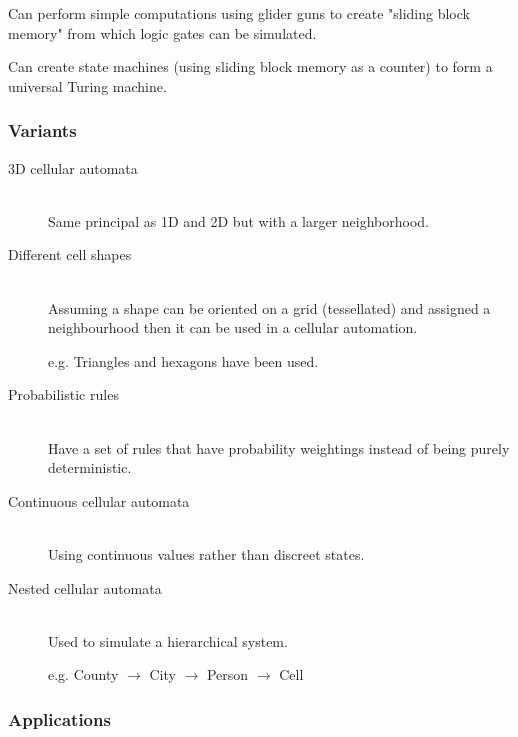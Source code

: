 \documentclass[a4paper]{article}
\begin{document}

Can perform simple computations using glider guns to create "sliding block
memory" from which logic gates can be simulated.

Can create state machines (using sliding block memory as a counter) to form a
universal Turing machine.

\subsubsection{Variants}

\begin{description}
  \item[3D cellular automata] \hfill \\
    Same principal as 1D and 2D but with a larger neighborhood.

  \item[Different cell shapes] \hfill \\
    Assuming a shape can be oriented on a grid (tessellated) and assigned a
    neighbourhood then it can be used in a cellular automation.

    e.g. Triangles and hexagons have been used.

  \item[Probabilistic rules] \hfill \\
    Have a set of rules that have probability weightings instead of being purely
    deterministic.

  \item[Continuous cellular automata] \hfill \\
    Using continuous values rather than discreet states.

  \item[Nested cellular automata] \hfill \\
    Used to simulate a hierarchical system.

    e.g. County $\rightarrow$ City $\rightarrow$ Person $\rightarrow$ Cell

\end{description}

\subsubsection{Applications}
\end{document}
